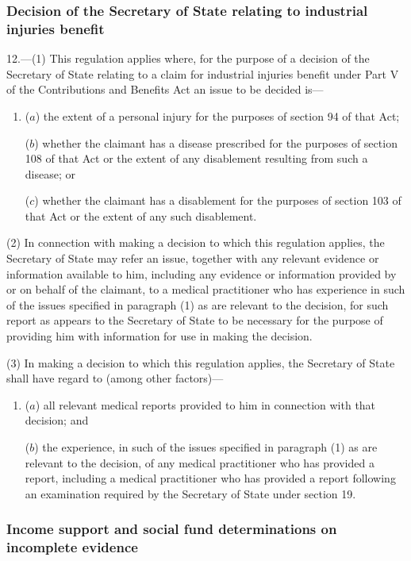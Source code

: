 \documentclass[12pt,a4paper]{article}
\begin{document}
\subsubsection[12. Decision of the Secretary of State relating to industrial injuries benefit]{Decision of the Secretary of State relating to industrial injuries benefit}

12.—(1) This regulation applies where, for the purpose of a decision of the Secretary of State relating to a claim for industrial injuries benefit under Part V of the Contributions and Benefits Act an issue to be decided is—
\begin{enumerate}\item[]
($a$) the extent of a personal injury for the purposes of section 94 of that Act;

($b$) whether the claimant has a disease prescribed for the purposes of section 108 of that Act or the extent of any disablement resulting from such a disease; or

($c$) whether the claimant has a disablement for the purposes of section 103 of that Act or the extent of any such disablement.
\end{enumerate}

(2) In connection with making a decision to which this regulation applies, the Secretary of State may refer an issue, together with any relevant evidence or information available to him, including any evidence or information provided by or on behalf of the claimant, to a medical practitioner who has experience in such of the issues specified in paragraph (1) as are relevant to the decision, for such report as appears to the Secretary of State to be necessary for the purpose of providing him with information for use in making the decision.

(3) In making a decision to which this regulation applies, the Secretary of State shall have regard to (among other factors)—
\begin{enumerate}\item[]
($a$) all relevant medical reports provided to him in connection with that decision; and

($b$) the experience, in such of the issues specified in paragraph (1) as are relevant to the decision, of any medical practitioner who has provided a report, including a medical practitioner who has provided a report following an examination required by the Secretary of State under section 19.
\end{enumerate}

\subsubsection[13. Income support and social fund determinations on incomplete evidence]{\sloppy Income support and social fund determinations on incomplete evidence}
\end{document}
